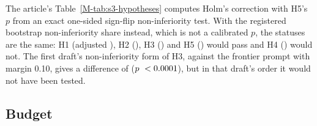 The article's Table~\ref{M-tab:s3-hypotheses} computes Holm's correction with H5's $p$ from an exact one-sided sign-flip non-inferiority test. With the registered bootstrap non-inferiority share instead, which is not a calibrated $p$, the statuses are the same: H1 (adjusted \sthreeFThreeBootHolmHOneAdjP), H2 (\sthreeFThreeBootHolmHTwoAdjP), H3 (\sthreeFThreeBootHolmHThreeAdjP) and H5 (\sthreeFThreeBootHolmHFiveAdjP) would pass and H4 (\sthreeFThreeBootHolmHFourAdjP) would not. The first draft's non-inferiority form of H3, against the frontier prompt with margin 0.10, gives a difference of \sthreeFThreeFirstDraftNIDiff{} ($p\ < 0.0001$), but in that draft's order it would not have been tested.

\subsection{Budget}

